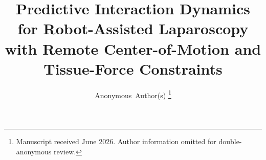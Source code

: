\documentclass[journal]{IEEEtran}
\begin{document}
\title{Predictive Interaction Dynamics for Robot-Assisted Laparoscopy with Remote Center-of-Motion and Tissue-Force Constraints}

\author{Anonymous~Author(s)%
\thanks{Manuscript received June 2026. Author information omitted for double-anonymous review.}%
}

\maketitle
\thispagestyle{empty}
\pagestyle{empty}


\end{document}
